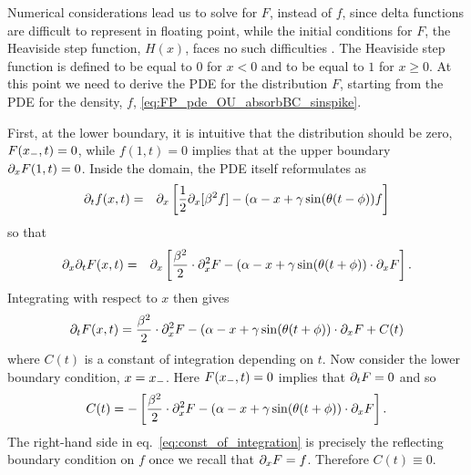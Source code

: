 
Numerical considerations lead us to solve for $F$, instead of $f$, since delta
functions are difficult to represent in floating point, while the initial
conditions for $F$, the Heaviside step function, $H(x)$, faces no such
difficulties \cite{Hurn2005}. The Heaviside step function is defined to be
equal to $0$ for $x<0$ and to be equal to $1$ for $x \geq 0$. At this point we
need to derive the PDE for the distribution $F$, starting from the PDE for the
density, $f$, \cref{eq:FP_pde_OU_absorbBC_sinspike}.

First, at the lower boundary, it is intuitive that the distribution should be
zero, $ F({ x_{-} },t) = 0 $, while $f(1,t) = 0$ implies that at the upper boundary
$ {\partial}_xF(1, t) = 0 $. Inside the domain, the PDE itself reformulates as
\begin{eqnarray*}
{\partial}_t f(x,t) &=&  {\partial}_x \left[\frac{1}{2}{\partial}_x [\beta^2 f] -  (\alpha - x + {\gamma } \sin({ \theta}
(t - \phi)) f \right]
\end{eqnarray*}
so that
\begin{eqnarray*}
{\partial}_x {\partial}_t F(x,t) &=& {\partial}_x \left[
\frac{\beta^2 }{2}\cdot {\partial}^2_x F -  
						(\alpha- x + {\gamma } \sin({ \theta} (t + \phi))  \cdot {\partial}_xF \right].
\end{eqnarray*}
Integrating with respect to $x$ then gives
$$
{\partial}_t F(x,t) =
\frac{\beta^2 }{2}\cdot {\partial}^2_x F -  
						(\alpha- x + {\gamma } \sin({ \theta} (t + \phi))  \cdot {\partial}_xF + C(t)
$$
where $C(t)$ is a constant of integration depending on $t$. Now consider
the lower boundary condition, $x =
{ x_{-} }$. Here $F({ x_{-} },t) = 0$ implies that ${\partial}_tF = 0$ and so 
\begin{equation}
C(t) = - \left[ \frac{\beta^2 }{2}\cdot {\partial}^2_x F -  
			(\alpha- x + {\gamma } \sin({ \theta} (t + \phi))  \cdot {\partial}_xF \right].	
\label{eq:const_of_integration}
\end{equation}
The right-hand side in eq.\ \eqref{eq:const_of_integration} is precisely the
reflecting boundary condition on $f$ once we recall that ${\partial}_x F = f$. Therefore $C(t) \equiv 0$.

